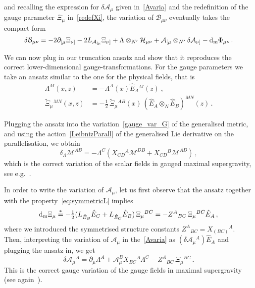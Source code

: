 \documentclass[debug]{phd}
\begin{document}
					and recalling the expression for $\delta{\mathcal A}_\mu$ given in~\eqref{Avaria} and the redefinition of the gauge parameter $\overline \Xi_\mu$ in~\eqref{redefXi}, the variation of $\mathcal{B}_{\mu\nu}$ eventually takes the compact form
							\begin{equation}\label{var_Bmunu}
								\delta \mathcal{B}_{\mu\nu} = -2\partial_{[\mu} \Xi_{\nu]} - 2 L_{\mathcal A_{[\mu}} \Xi_{\nu]} + \Lambda\otimes_{N'} \mathcal{H}_{\mu\nu} + \mathcal{A}_{[\mu} \otimes_{N'} \delta\mathcal{A}_{\nu]} - \mathrm{d}_{\mathrm{m}}\Phi_{\mu\nu} \, .
							\end{equation}

					We can now plug in our truncation ansatz and show that it reproduces the correct lower-dimensional gauge-transformations. 
					For the gauge parameters we take an ansatz similar to the one for the physical fields, that is
							\begin{equation}
								\begin{split}
									\Lambda^M(x,z) &= -\Lambda^A(x) \hat{E}_A{}^M(z)\ , \\
									\widetilde{\Xi}_\mu{}^{MN}(x,z) &= -\tfrac{1}{2}\,\widetilde{\Xi}_\mu{}^{AB}(x)\, (\hat{E}_A{} \otimes_N \!\hat{E}_B)^{MN}(z)\,.
								\end{split}
							\end{equation}

					Plugging the ansatz into the variation~\eqref{gauge_var_G} of the generalised metric, and using the action~\eqref{LeibnizParall} of the generalised Lie derivative on the parallelisation, we obtain
							\begin{equation}
								\delta_{\Lambda} \mathcal{M}^{AB} = -\Lambda^C (X_{CD}{}^A \mathcal{M}^{DB} + X_{CD}{}^B\mathcal{M}^{AD}) \, ,
							\end{equation}
					which is the correct variation of the scalar fields in gauged maximal supergravity, see e.g.~\cite{henlect}.

					In order to write the variation of $\mathcal A_\mu$, let us first observe that the ansatz together with the property~\eqref{eq:symmetricL} implies
							\begin{equation}
								\mathrm{d}_{\mathrm{m}} \Xi_\mu \stackrel{*}{=} -\tfrac{1}{2}(L_{\hat{E}_B}\hat{E}_C + L_{\hat{E}_C}\hat{E}_B)\, \Xi_\mu{}^{BC} = - Z^A{}_{BC}\, \Xi_\mu{}^{BC}\hat{E}_A \, ,
							\end{equation}
					where we introduced the symmetrised structure constants $Z^A{}_{BC}=X_{(BC)}{}^A$.
					Then, interpreting the variation of $\mathcal A_\mu$ in the~\eqref{Avaria} as $(\delta \mathcal{A}_\mu{}^A) \hat{E}_A $ and plugging the ansatz in, we get
							\begin{equation}
								\delta \mathcal{A}_\mu{}^A = \partial_\mu \Lambda^A + \mathcal{A}_\mu^B X_{BC}{}^A \Lambda^C - Z^A{}_{BC}\, \Xi_\mu{}^{BC} \, .
							\end{equation}
					This is the correct gauge variation of the gauge fields in maximal supergravity (see again~\cite{henlect}).
 
\end{document}
